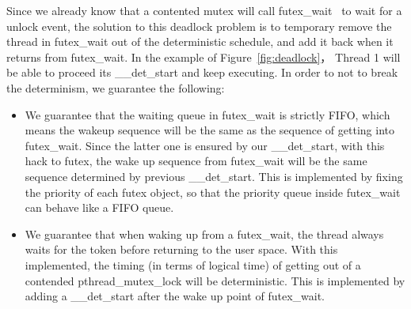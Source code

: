 Since we already know that a contented mutex will call futex\_wait~\cite{drepper2005futexes} to wait for a unlock event, the solution to this deadlock problem is to temporary remove the thread in futex\_wait out of the deterministic schedule, and add it back when it returns from futex\_wait. In the example of Figure~\ref{fig:deadlock}， Thread 1 will be able to proceed its \_\_det\_start and keep executing. In order to not to break the determinism, we guarantee the following:
\begin{itemize}
\item We guarantee that the waiting queue in futex\_wait is strictly FIFO, which means the wakeup sequence will be the same as the sequence of getting into futex\_wait. Since the latter one is ensured by our \_\_det\_start, with this hack to futex, the wake up sequence from futex\_wait will be the same sequence determined by previous \_\_det\_start. This is implemented by fixing the priority of each futex object, so that the priority queue inside futex\_wait can behave like a FIFO queue.
\item We guarantee that when waking up from a futex\_wait, the thread always waits for the token before returning to the user space. With this implemented, the timing (in terms of logical time) of getting out of a contended pthread\_mutex\_lock will be deterministic. This is implemented by adding a \_\_det\_start after the wake up point of futex\_wait.
\end{itemize}


